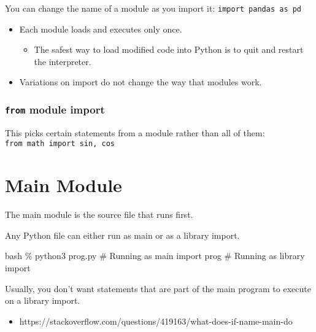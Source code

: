 \documentclass[
  letterpaper,
  DIV=11,
  numbers=noendperiod]{scrreprt}
\newenvironment{Shaded}{\begin{snugshade}}{\end{snugshade}}
\newcommand{\CommentTok}[1]{\textcolor[rgb]{0.37,0.37,0.37}{#1}}
\newcommand{\ImportTok}[1]{\textcolor[rgb]{0.00,0.46,0.62}{#1}}
\newcommand{\NormalTok}[1]{\textcolor[rgb]{0.00,0.46,0.62}{#1}}
\newcommand{\OperatorTok}[1]{\textcolor[rgb]{0.37,0.37,0.37}{#1}}
\providecommand{\tightlist}{%
  \setlength{\itemsep}{0pt}\setlength{\parskip}{0pt}}
\begin{document}
You can change the name of a module as you import it:
\texttt{import\ pandas\ as\ pd}

\begin{itemize}
\tightlist
\item
  Each module loads and executes only once.

  \begin{itemize}
  \tightlist
  \item
    The safest way to load modified code into Python is to quit and
    restart the interpreter.
  \end{itemize}
\item
  Variations on import do not change the way that modules work.
\end{itemize}

\hypertarget{from-module-import}{%
\subsubsection{\texorpdfstring{\texttt{from} module
import}{from module import}}\label{from-module-import}}

This picks certain statements from a module rather than all of them:
\texttt{from\ math\ import\ sin,\ cos}

\hypertarget{main-module}{%
\section{Main Module}\label{main-module}}

The main module is the source file that runs first.

Any Python file can either run as main or as a library import.

\begin{Shaded}
\begin{Highlighting}[]
\NormalTok{bash }\OperatorTok{\%}\NormalTok{ python3 prog.py }\CommentTok{\# Running as main}
\ImportTok{import}\NormalTok{ prog   }\CommentTok{\# Running as library import}
\end{Highlighting}
\end{Shaded}

Usually, you don't want statements that are part of the main program to
execute on a library import.

\begin{itemize}
\tightlist
\item
  https://stackoverflow.com/questions/419163/what-does-if-name-main-do
\end{itemize}
\end{document}
